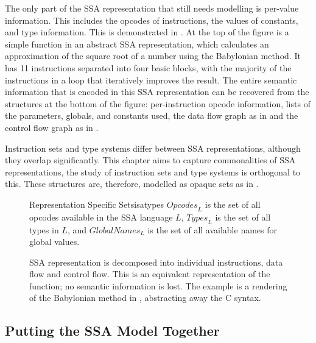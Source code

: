     The only part of the SSA representation that still needs modelling is
    per-value information.
    This includes the opcodes of instructions, the values of constants,
    and type information.
    This is demonstrated in .
    At the top of the figure is a simple function in an abstract SSA
    representation, which calculates an approximation of the square root of a
    number using the Babylonian method.
    It has 11 instructions separated into four basic blocks, with the majority
    of the instructions in a loop that iteratively improves the result.
    The entire semantic information that is encoded in this SSA representation
    can be recovered from the structures at the bottom of the figure:
    per-instruction opcode information, lists of the parameters, globals, and
    constants used, the data flow graph as in  and the control
    flow graph as in .

    Instruction sets and type systems differ between SSA representations,
    although they overlap significantly.
    This chapter aims to capture commonalities of SSA representations, the study
    of instruction sets and type systems is orthogonal to this.
    These structures are, therefore, modelled as opaque sets as in
    .

\begin{figure}[h]
\begin{definition}{Representation Specific Sets}{isatypes}
    $\textit{Opcodes}_L$ is the set of all opcodes available in the SSA language $L$,
    $\textit{Types}_L$ is the set of all types in $L$,
    and $\textit{GlobalNames}_L$ is the set of all available names for global values.
\end{definition}
\end{figure}

\begin{figure}[p]

\caption{SSA representation is decomposed into individual instructions, data
         flow and control flow.
         This is an equivalent representation of the function; no semantic
         information is lost.
         The example is a rendering of the Babylonian method in
         , abstracting away the C syntax.}
\label{fig:separation}
\end{figure}

\subsection{Putting the SSA Model Together}

